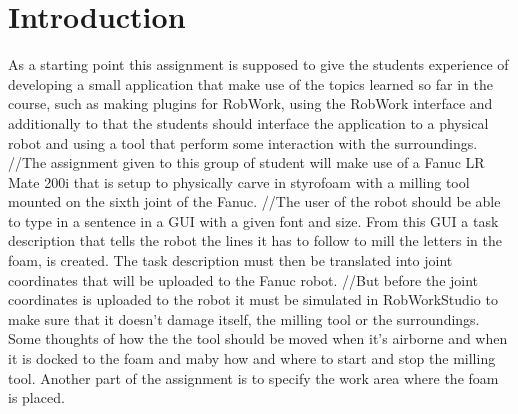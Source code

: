 \section{Introduction}
\label{sec:intro}

As a starting point this assignment is supposed to give the students experience of developing a small application that make use of the topics learned so far in the course, such as making plugins for RobWork, using the RobWork interface and additionally to that the students should interface the application to a physical robot and using a tool that perform some interaction with the surroundings.
//The assignment given to this group of student will make use of a Fanuc LR Mate 200i that is setup to physically carve in styrofoam with a milling tool mounted on the sixth joint of the Fanuc.
//The user of the robot should be able to type in a sentence in a GUI with a given font and size. From this GUI a task description that tells the robot the lines it has to follow to mill the letters in the foam, is created. The task description must then be translated into joint coordinates that will be uploaded to the Fanuc robot.
//But before the joint coordinates is uploaded to the robot it must be simulated in RobWorkStudio to make sure that it doesn't damage itself, the milling tool or the surroundings. Some thoughts of how the the tool should be moved when it's airborne and when it is docked to the foam and maby how and where to start and stop the milling tool. Another part of the assignment is to specify the work area where the foam is placed.